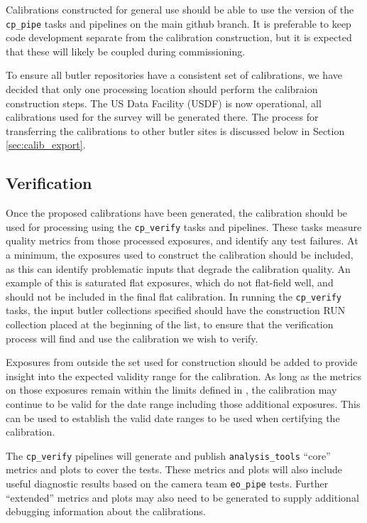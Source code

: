 \documentclass[DM,authoryear,toc]{lsstdoc}
\begin{document}
Calibrations constructed for general use should be able to use the version of the \verb|cp_pipe| tasks and pipelines on the main github branch.  It is preferable to keep code development separate from the calibration construction, but it is expected that these will likely be coupled during commissioning.

To ensure all butler repositories have a consistent set of calibrations, we have decided that only one processing location should perform the calibraion construction steps.  The US Data Facility (USDF) is now operational, all calibrations used for the survey will be generated there.  The process for transferring the calibrations to other butler sites is discussed below in Section \ref{sec:calib_export}.

\subsection{Verification}

Once the proposed calibrations have been generated, the calibration should be used for processing using the \verb|cp_verify| tasks and pipelines.  These tasks measure quality metrics from those processed exposures, and identify any test failures.  At a minimum, the exposures used to construct the calibration should be included, as this can identify problematic inputs that degrade the calibration quality.  An example of this is saturated flat exposures, which do not flat-field well, and should not be included in the final flat calibration.  In running the \verb|cp_verify| tasks, the input butler collections specified should have the construction RUN collection placed at the beginning of the list, to ensure that the verification process will find and use the calibration we wish to verify.

Exposures from outside the set used for construction should be added to provide insight into the expected validity range for the calibration.  As long as the metrics on those exposures remain within the limits defined in , the calibration may continue to be valid for the date range including those additional exposures.  This can be used to establish the valid date ranges to be used when certifying the calibration.

The \verb|cp_verify| pipelines will generate and publish \verb|analysis_tools| ``core'' metrics and plots to cover the  tests.  These metrics and plots will also include useful diagnostic results based on the camera team \verb|eo_pipe| tests.  Further ``extended'' metrics and plots may also need to be generated to supply additional debugging information about the calibrations.
\end{document}
